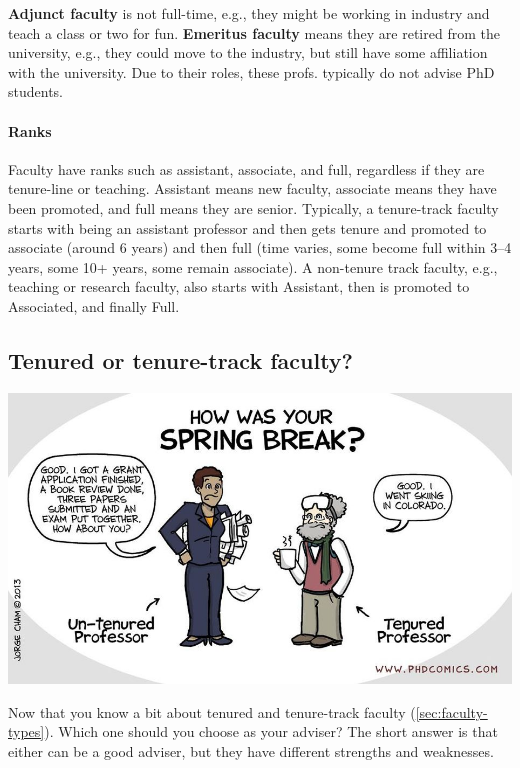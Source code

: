 \documentclass[oneside,11pt,dvipsnames]{book}
\begin{document}
\textbf{Adjunct faculty} is not full-time, e.g., they might be working in industry and teach a class or two for fun. \textbf{Emeritus faculty} means they are retired from the university, e.g., they could move to the industry, but still have some affiliation with the university.   Due to their roles, these profs. typically do not advise PhD students.


\paragraph{Ranks} Faculty have ranks such as assistant, associate, and full, regardless if they are tenure-line or teaching.  Assistant means new faculty, associate means they have been promoted, and full means they are senior. Typically, a tenure-track faculty starts with being an assistant professor and then gets tenure and promoted to associate (around 6 years) and then full (time varies, some become full within 3--4 years, some 10+ years, some remain associate). A non-tenure track faculty, e.g., teaching or research faculty, also starts with Assistant, then is promoted to Associated, and finally Full.




\subsection{Tenured or tenure-track faculty?}\label{sec:tenure-vs-tenure-track}

\begin{center}
  \includegraphics[scale=0.4]{files/c8.png}
\end{center}

Now that you know a bit about tenured and tenure-track faculty (\autoref{sec:faculty-types}).  Which one should you choose as your adviser? The short answer is that either can be a good adviser, but they have different strengths and weaknesses.
\end{document}
